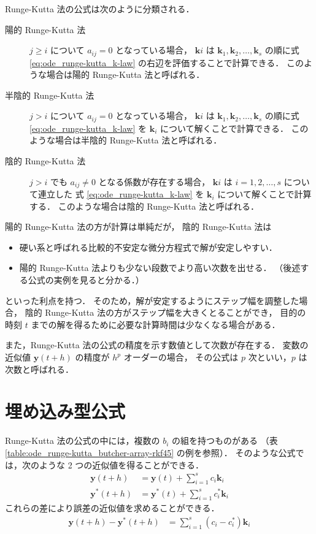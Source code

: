 Runge-Kutta 法の公式は次のように分類される．

\begin{description}
    \item[陽的 Runge-Kutta 法] $j \ge i$ について $a_{ij} = 0$ となっている場合，
          $\bm{k}i$ は $\bm{k}_1, \bm{k}_2, \ldots, \bm{k}_s$
          の順に式 \eqref{eq:ode_runge-kutta_k-law} の右辺を評価することで計算できる．
          このような場合は陽的 Runge-Kutta 法と呼ばれる．
    \item[半陰的 Runge-Kutta 法] $j > i$ について $a_{ij} = 0$ となっている場合，
          $\bm{k}i$ は $\bm{k}_1, \bm{k}_2, \ldots, \bm{k}_s$
          の順に式 \eqref{eq:ode_runge-kutta_k-law} を $\bm{k}_i$ について解くことで計算できる．
          このような場合は半陰的 Runge-Kutta 法と呼ばれる．
    \item[陰的 Runge-Kutta 法] $j > i$ でも $a_{ij} \neq 0$ となる係数が存在する場合，
          $\bm{k}i$ は $i = 1, 2, \ldots, s$ について連立した
          式 \eqref{eq:ode_runge-kutta_k-law} を $\bm{k}_i$ について解くことで計算する．
          このような場合は陰的 Runge-Kutta 法と呼ばれる．
\end{description}

陽的 Runge-Kutta 法の方が計算は単純だが，
陰的 Runge-Kutta 法は

\begin{itemize}
    \item 硬い系と呼ばれる比較的不安定な微分方程式で解が安定しやすい．
    \item 陽的 Runge-Kutta 法よりも少ない段数でより高い次数を出せる．
          （後述する公式の実例を見ると分かる．）
\end{itemize}

といった利点を持つ．
そのため，解が安定するようにステップ幅を調整した場合，
陰的 Runge-Kutta 法の方がステップ幅を大きくとることができ，
目的の時刻 $t$ までの解を得るために必要な計算時間は少なくなる場合がある．

また，Runge-Kutta 法の公式の精度を示す数値として次数が存在する．
変数の近似値 $\bm{y}(t + h)$ の精度が $h^p$ オーダーの場合，
その公式は $p$ 次といい，$p$ は次数と呼ばれる．

\section{埋め込み型公式}

Runge-Kutta 法の公式の中には，複数の $b_i$ の組を持つものがある
（表 \ref{table:ode_runge-kutta_butcher-array-rkf45} の例を参照）．
そのような公式では，次のような 2 つの近似値を得ることができる．
\begin{align}
    \bm{y}(t + h)   & = \bm{y}(t) + \sum_{i=1}^s c_i \bm{k}_i     \\
    \bm{y}^*(t + h) & = \bm{y}^*(t) + \sum_{i=1}^s c_i^* \bm{k}_i
\end{align}
これらの差により誤差の近似値を求めることができる．
\begin{align}
    \bm{y}(t + h) - \bm{y}^*(t + h) & = \sum_{i=1}^s (c_i - c_i^*) \bm{k}_i
\end{align}

